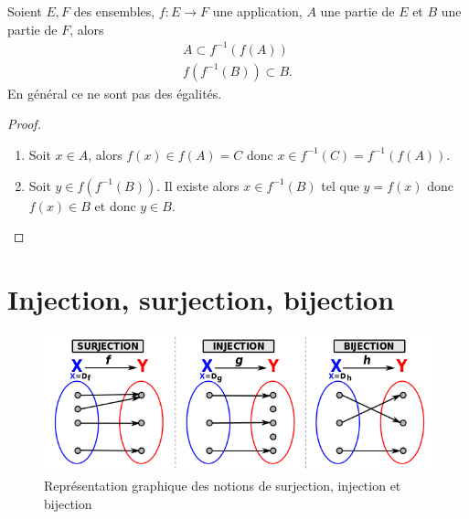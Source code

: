 %
\begin{prop}
  Soient $E,F$ des ensembles, $f:E\longrightarrow F$ une application, $A$ une partie de $E$ et $B$ une partie de $F$, alors
  \begin{gather}
    A \subset f^{-1}(f(A)) \\
    f(f^{-1}(B)) \subset B.
  \end{gather}
  En général ce ne sont pas des égalités.
\end{prop}
\begin{proof}
  \begin{enumerate}
  \item Soit $x \in A$, alors $f(x) \in f(A) = C$ donc $x \in f^{-1}(C)=f^{-1}(f(A))$.
  \item Soit $y \in f(f^{-1}(B))$. Il existe alors $x \in f^{-1}(B)$ tel que $y=f(x)$ donc $f(x) \in B$ et donc $y \in B$.
  \end{enumerate}
\end{proof}
%
\section{Injection, surjection, bijection}
\label{chap3-sec:injsurbij}
%
\begin{figure}
  \centering
  \includegraphics[scale=0.7, width=\textwidth]{Surjection_Injection_Bijection.png}
  \caption[Surjection, injection et bijection]{Représentation graphique des notions de surjection, injection et bijection}
  \label{chap3-fig:surjinjbij}
\end{figure}
%
